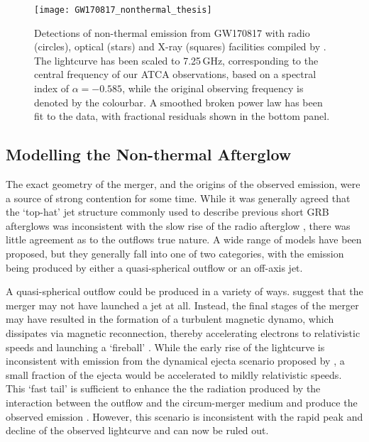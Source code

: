 \begin{figure}
    \centering
    \texttt{[image: GW170817\_nonthermal\_thesis]}
    \caption[Lightcurve of non-thermal emission from GW170817]{Detections of non-thermal emission from GW170817 with radio (circles), optical (stars) and X-ray (squares) facilities compiled by \citep{2020arXiv200602382M}. The lightcurve has been scaled to 7.25\,GHz, corresponding to the central frequency of our ATCA observations, based on a spectral index of $\alpha=-0.585$, while the original observing frequency is denoted by the colourbar. A smoothed broken power law has been fit to the data, with fractional residuals shown in the bottom panel.}
    \label{fig:gw170817_nonthermal_lightcurve}
\end{figure}

\subsection{Modelling the Non-thermal Afterglow}
\label{subsec:GW170817_afterglow_models}
The exact geometry of the merger, and the origins of the observed emission, were a source of strong contention for some time. While it was generally agreed that the `top-hat' jet structure \citep{1965PhFl....8.1428G} commonly used to describe previous short GRB afterglows was inconsistent with the slow rise of the radio afterglow \citep{2017Sci...358.1559K,2018ApJ...856L..18M}, there was little agreement as to the outflows true nature. A wide range of models have been proposed, but they generally fall into one of two categories, with the emission being produced by either a quasi-spherical outflow or an off-axis jet.

A quasi-spherical outflow could be produced in a variety of ways. \citet{2018MNRAS.474L...7S} suggest that the merger may not have launched a jet at all. Instead, the final stages of the merger may have resulted in the formation of a turbulent magnetic dynamo, which dissipates via magnetic reconnection, thereby accelerating electrons to relativistic speeds and launching a `fireball' \citep{2013ApJ...769L..29Z,2015ApJ...809...39G}. While the early rise of the lightcurve is inconsistent with emission from the dynamical ejecta scenario proposed by \citet{2011Natur.478...82N}, a small fraction of the ejecta would be accelerated to mildly relativistic speeds. This `fast tail' is sufficient to enhance the the radiation produced by the interaction between the outflow and the circum-merger medium  and produce the observed emission \citep{2018ApJ...867...95H}. However, this scenario is inconsistent with the rapid peak and decline of the observed lightcurve and can now be ruled out.


